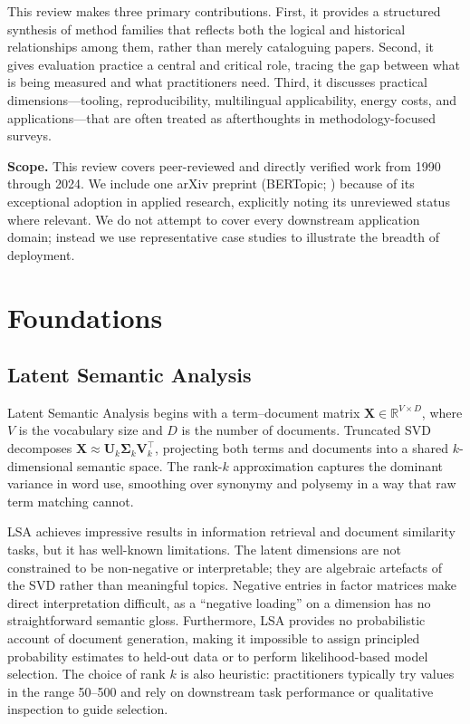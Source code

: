 \documentclass[11pt,a4paper]{article}
\newcommand{\R}{\mathbb{R}}
\begin{document}
This review makes three primary contributions.
First, it provides a structured synthesis of method families that
reflects both the logical and historical relationships among them,
rather than merely cataloguing papers.
Second, it gives evaluation practice a central and critical role,
tracing the gap between what is being measured and what practitioners
need.
Third, it discusses practical dimensions---tooling, reproducibility,
multilingual applicability, energy costs, and applications---that are
often treated as afterthoughts in methodology-focused surveys.

\medskip
\noindent\textbf{Scope.}\quad
This review covers peer-reviewed and directly verified work from 1990
through 2024.
We include one arXiv preprint (BERTopic; \cite{grootendorst2022bertopic})
because of its exceptional adoption in applied research, explicitly
noting its unreviewed status where relevant.
We do not attempt to cover every downstream application domain; instead
we use representative case studies to illustrate the breadth of
deployment.

\section{Foundations}
\label{sec:foundations}

\subsection{Latent Semantic Analysis}
\label{sec:lsa}

Latent Semantic Analysis \parencite{deerwester1990indexing} begins with a
term--document matrix $\mathbf{X} \in \R^{V \times D}$, where $V$ is the
vocabulary size and $D$ is the number of documents.
Truncated SVD decomposes $\mathbf{X} \approx \mathbf{U}_{k}
\mathbf{\Sigma}_{k} \mathbf{V}_{k}^{\top}$, projecting both terms and
documents into a shared $k$-dimensional semantic space.
The rank-$k$ approximation captures the dominant variance in word use,
smoothing over synonymy and polysemy in a way that raw term matching
cannot.

LSA achieves impressive results in information retrieval and
document similarity tasks, but it has well-known limitations.
The latent dimensions are not constrained to be non-negative or
interpretable; they are algebraic artefacts of the SVD rather than
meaningful topics.
Negative entries in factor matrices make direct interpretation
difficult, as a ``negative loading'' on a dimension has no
straightforward semantic gloss.
Furthermore, LSA provides no probabilistic account of document
generation, making it impossible to assign principled probability
estimates to held-out data or to perform likelihood-based model
selection.
The choice of rank $k$ is also heuristic: practitioners typically try
values in the range 50--500 and rely on downstream task performance or
qualitative inspection to guide selection.
\end{document}
